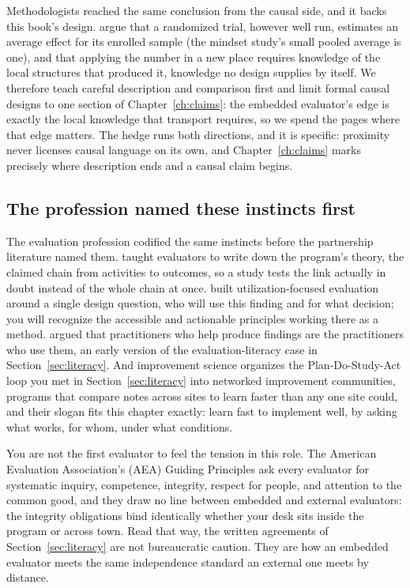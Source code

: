 Methodologists reached the same conclusion from the causal side, and it backs this book's design. \textcite{deaton2018rcts} argue that a randomized trial, however well run, estimates an average effect for its enrolled sample (the mindset study's small pooled average is one), and that applying the number in a new place requires knowledge of the local structures that produced it, knowledge no design supplies by itself. We therefore teach careful description and comparison first and limit formal causal designs to one section of Chapter~\ref{ch:claims}: the embedded evaluator's edge is exactly the local knowledge that transport requires, so we spend the pages where that edge matters. The hedge runs both directions, and it is specific: proximity never licenses causal language on its own, and Chapter~\ref{ch:claims} marks precisely where description ends and a causal claim begins.

\subsection{The profession named these instincts first}\label{sec:ch01-profession-instincts}
The evaluation profession codified the same instincts before the partnership literature named them. \textcite{weiss1998evaluation} taught evaluators to write down the program's theory, the claimed chain from activities to outcomes, so a study tests the link actually in doubt instead of the whole chain at once. \textcite{patton2008utilization} built utilization-focused evaluation around a single design question, who will use this finding and for what decision; you will recognize the accessible and actionable principles working there as a method. \textcite{cousins1992participatory} argued that practitioners who help produce findings are the practitioners who use them, an early version of the evaluation-literacy case in Section~\ref{sec:literacy}. And improvement science \parencite{bryk2015improve} organizes the Plan-Do-Study-Act loop you met in Section~\ref{sec:literacy} into networked improvement communities, programs that compare notes across sites to learn faster than any one site could, and their slogan fits this chapter exactly: learn fast to implement well, by asking what works, for whom, under what conditions.

You are not the first evaluator to feel the tension in this role. The American Evaluation Association's (AEA) Guiding Principles \parencite{aea2018principles} ask every evaluator for systematic inquiry, competence, integrity, respect for people, and attention to the common good, and they draw no line between embedded and external evaluators: the integrity obligations bind identically whether your desk sits inside the program or across town. Read that way, the written agreements of Section~\ref{sec:literacy} are not bureaucratic caution. They are how an embedded evaluator meets the same independence standard an external one meets by distance.

